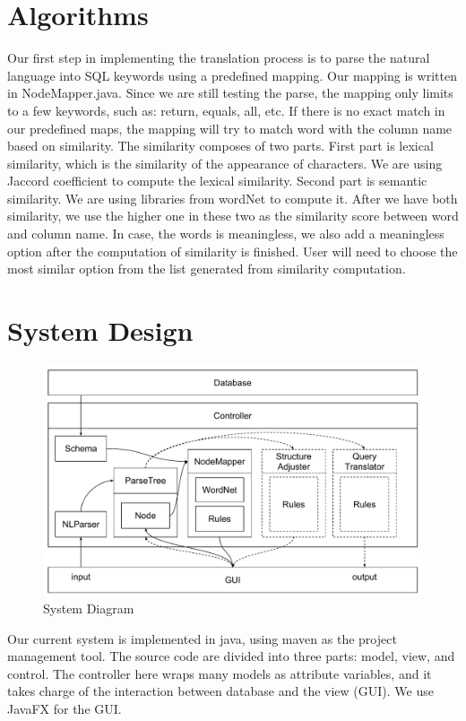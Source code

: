 \documentclass[twocolumn]{article}
\begin{document}
\section{Algorithms}
Our first step in implementing the translation process is to parse the natural language into SQL keywords using a predefined mapping. Our mapping is written in NodeMapper.java. Since we are still testing the parse, the mapping only limits to a few keywords, such as: return, equals, all, etc. If there is no exact match in our predefined maps, the mapping will try to match word with the column name based on similarity. The similarity composes of two parts. First part is lexical similarity, which is the similarity of the appearance of characters. We are using Jaccord coefficient to compute the lexical similarity. Second part is semantic similarity. We are using libraries from wordNet to compute it. After we have both similarity, we use the higher one in these two as the similarity score between word and column name. In case, the words is meaningless, we also add a meaningless option after the computation of similarity is finished. User will need to choose the most similar option from the list generated from similarity computation. 


\section{System Design}

\begin{figure}[ht]
  \centerline{\includegraphics[width=0.8\linewidth]{figures/nlidb_system_diagram.pdf}}
  \caption{System Diagram}
\end{figure}

Our current system is implemented in java, using maven as the project management tool. The source code are divided into three parts: model, view, and control. The controller here wraps many models as attribute variables, and it takes charge of the interaction between database and the view (GUI). We use JavaFX for the GUI.
\end{document}
